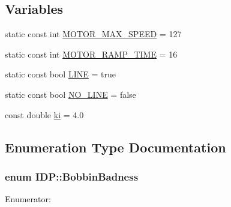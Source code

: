 \subsection*{Variables}
\begin{DoxyCompactItemize}
\item 
static const int \hyperlink{namespaceIDP_a4ead0b21ad2c507b542445695182d4cd}{MOTOR\_\-MAX\_\-SPEED} = 127
\item 
static const int \hyperlink{namespaceIDP_ab3a00a6cc8a6dba271e38d337daf4703}{MOTOR\_\-RAMP\_\-TIME} = 16
\item 
static const bool \hyperlink{namespaceIDP_a559427fa7c37f2edc0a43a4b793c4fdc}{LINE} = true
\item 
static const bool \hyperlink{namespaceIDP_a5ea027b77276a637783f68955303b9b8}{NO\_\-LINE} = false
\item 
const double \hyperlink{namespaceIDP_aa2b933f600179026dbca5d8bc63c3baf}{ki} = 4.0
\end{DoxyCompactItemize}


\subsection{Enumeration Type Documentation}
\hypertarget{namespaceIDP_adf12b2c1e1c228810b18c34a3c88c32d}{
\subsubsection[{BobbinBadness}]{\setlength{\rightskip}{0pt plus 5cm}enum {\bf IDP::BobbinBadness}}}
\label{namespaceIDP_adf12b2c1e1c228810b18c34a3c88c32d}
\begin{Desc}
\item[Enumerator: ]\par
\begin{description}
\item[{\em 
\hypertarget{namespaceIDP_adf12b2c1e1c228810b18c34a3c88c32dafdc1b8b5a9d849fd99ac2ae438b632dd}{
BOBBIN\_\-GOOD}
\label{namespaceIDP_adf12b2c1e1c228810b18c34a3c88c32dafdc1b8b5a9d849fd99ac2ae438b632dd}
}]\item[{\em 
\hypertarget{namespaceIDP_adf12b2c1e1c228810b18c34a3c88c32da6cb4993a316e9d4dc9836d3d990fd0f6}{
BOBBIN\_\-BAD}
\label{namespaceIDP_adf12b2c1e1c228810b18c34a3c88c32da6cb4993a316e9d4dc9836d3d990fd0f6}
}]\end{description}
\end{Desc}

